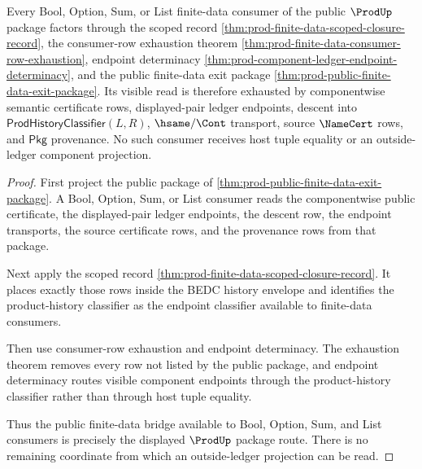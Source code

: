 \begin{theorem}
\label{thm:prod-finite-data-public-bridge-consumer}
Every Bool, Option, Sum, or List finite-data consumer of the public $\ProdUp$
package factors through the scoped record
\autoref{thm:prod-finite-data-scoped-closure-record}, the consumer-row
exhaustion theorem
\autoref{thm:prod-finite-data-consumer-row-exhaustion}, endpoint determinacy
\autoref{thm:prod-component-ledger-endpoint-determinacy}, and the public
finite-data exit package
\autoref{thm:prod-public-finite-data-exit-package}. Its visible read is
therefore exhausted by componentwise semantic certificate rows,
displayed-pair ledger endpoints, descent into
$\mathsf{ProdHistoryClassifier}(L,R)$, $\hsame/\Cont$ transport, source
$\NameCert$ rows, and $\mathsf{Pkg}$ provenance. No such consumer receives
host tuple equality or an outside-ledger component projection.
\end{theorem}
\begin{proof}
First project the public package of
\autoref{thm:prod-public-finite-data-exit-package}. A Bool, Option, Sum, or
List consumer reads the componentwise public certificate, the displayed-pair
ledger endpoints, the descent row, the endpoint transports, the source
certificate rows, and the provenance rows from that package.

Next apply the scoped record
\autoref{thm:prod-finite-data-scoped-closure-record}. It places exactly those
rows inside the BEDC history envelope and identifies the product-history
classifier as the endpoint classifier available to finite-data consumers.

Then use consumer-row exhaustion and endpoint determinacy. The exhaustion
theorem removes every row not listed by the public package, and endpoint
determinacy routes visible component endpoints through the product-history
classifier rather than through host tuple equality.

Thus the public finite-data bridge available to Bool, Option, Sum, and List
consumers is precisely the displayed $\ProdUp$ package route. There is no
remaining coordinate from which an outside-ledger projection can be read.
\end{proof}
